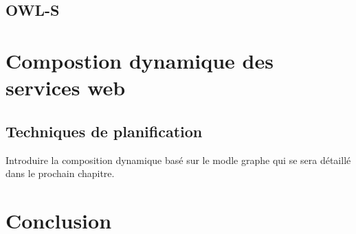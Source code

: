 


    \subsection{OWL-S}
    \label{sec:owl-s}
    \cite{mcilraith2003bringing}

  \section{Compostion dynamique des services web}
  \label{sec:comp-dynam}

    \subsection{Techniques de planification}
    \cite{bartalos2011effective}
    \label{sec:techn-de-plan}

  Introduire la composition dynamique basé sur le modle graphe qui se
  sera détaillé dans le prochain chapitre.
  \section{Conclusion}
  \label{sec:conclusion}
 

